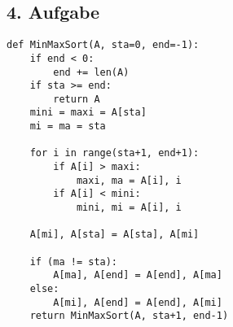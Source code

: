 \documentclass[a5paper]{article}
\theoremstyle{remark}
\begin{document}
\subsection{4. Aufgabe}
\begin{verbatim}
def MinMaxSort(A, sta=0, end=-1):
    if end < 0:
        end += len(A)
    if sta >= end:
        return A
    mini = maxi = A[sta]
    mi = ma = sta

    for i in range(sta+1, end+1):
        if A[i] > maxi:
            maxi, ma = A[i], i
        if A[i] < mini:
            mini, mi = A[i], i

    A[mi], A[sta] = A[sta], A[mi]

    if (ma != sta):
        A[ma], A[end] = A[end], A[ma]
    else:
        A[mi], A[end] = A[end], A[mi]
    return MinMaxSort(A, sta+1, end-1)
\end{verbatim}
\end{document}
